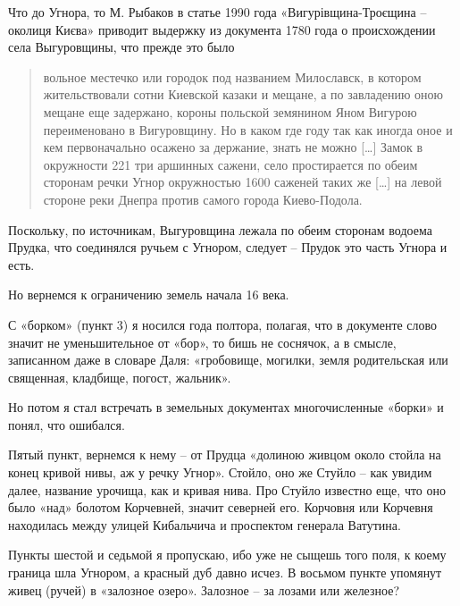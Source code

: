 Что до Угнора, то М. Рыбаков в статье 1990 года «Вигурівщина-Троєщина – околиця Києва» приводит выдержку из документа 1780 года о происхождении села Выгуровщины, что прежде это было

\begin{quotation}
вольное местечко или городок под названием Милославск, в котором жительствовали сотни Киевской казаки и мещане, а по завладению оною мещане еще задержано, короны польской земянином Яном Вигурою переименовано в Вигуровщину. Но в каком где году так как иногда оное и кем первоначально осажено за держание, знать не можно […] Замок в окружности 221 три аршинных сажени, село простирается по обеим сторонам речки Угнор окружностью 1600 саженей таких же […] на левой стороне реки Днепра против самого города Киево-Подола.
\end{quotation} 

Поскольку, по источникам, Выгуровщина лежала по обеим сторонам водоема Прудка, что соединялся ручьем с Угнором, следует – Прудок это часть Угнора и есть.
 
Но вернемся к ограничению земель начала 16 века.

С «борком» (пункт 3) я носился года полтора, полагая, что в документе слово значит не уменьшительное от «бор», то бишь не соснячок, а в смысле, записанном даже в словаре Даля: «гробовище, могилки, земля родительская или священная, кладбище, погост, жальник».

Но потом я стал встречать в земельных документах многочисленные «борки» и понял, что ошибался.



Пятый пункт, вернемся к нему – от Прудца «долиною живцом около стойла на конец кривой нивы, аж у речку Угнор». Стойло, оно же Стуйло – как увидим далее, название урочища, как и кривая нива. Про Стуйло известно еще, что оно было «над» болотом Корчевней, значит северней его. Корчовня или Корчевня находилась между улицей Кибальчича и проспектом генерала Ватутина.

Пункты шестой и седьмой я пропускаю, ибо уже не сыщешь того поля, к коему граница шла Угнором, а красный дуб давно исчез. В восьмом пункте упомянут живец (ручей) в «залозное озеро». Залозное – за лозами или железное?

